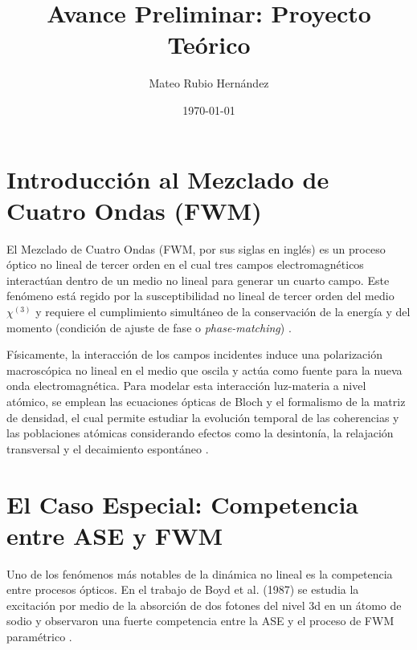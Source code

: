 \documentclass[12pt,a4paper]{article}
\title{Avance Preliminar: Proyecto Teórico}
\author{Mateo Rubio Hernández}
\date{\today}
\begin{document}
\maketitle


\section{Introducción al Mezclado de Cuatro Ondas (FWM)}
El Mezclado de Cuatro Ondas (FWM, por sus siglas en inglés) es un proceso óptico no lineal de tercer orden en el cual tres campos electromagnéticos interactúan dentro de un medio no lineal para generar un cuarto campo. Este fenómeno está regido por la susceptibilidad no lineal de tercer orden del medio $\chi^{(3)}$ y requiere el cumplimiento simultáneo de la conservación de la energía y del momento (condición de ajuste de fase o \textit{phase-matching}) \cite{Becerra2008}.

Físicamente, la interacción de los campos incidentes induce una polarización macroscópica no lineal en el medio que oscila y actúa como fuente para la nueva onda electromagnética. Para modelar esta interacción luz-materia a nivel atómico, se emplean las ecuaciones ópticas de Bloch y el formalismo de la matriz de densidad, el cual permite estudiar la evolución temporal de las coherencias y las poblaciones atómicas considerando efectos como la desintonía, la relajación transversal y el decaimiento espontáneo \cite{Documento2025}.

\section{El Caso Especial: Competencia entre ASE y FWM}
Uno de los fenómenos más notables de la dinámica no lineal es la competencia 
entre procesos ópticos. En el trabajo de Boyd et al. (1987) se estudia la excitación 
por medio de la absorción de dos fotones del nivel 3d en un átomo de sodio y 
observaron una fuerte competencia entre la ASE y el proceso de FWM paramétrico \cite{Boyd1987}.
\end{document}
